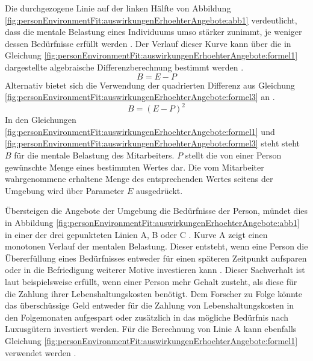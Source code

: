 Die durchgezogene Linie auf der linken Hälfte von Abbildung \ref{fig:personEnvironmentFit:auswirkungenErhoehterAngebote:abb1} verdeutlicht, dass die mentale Belastung eines Individuums umso stärker zunimmt, je weniger dessen Bedürfnisse erfüllt werden \cite[S. 30]{mechanismsOfJobStressAndStrain:1982}\cite[S. 10]{harrison:1978}. Der Verlauf dieser Kurve kann über die in Gleichung \ref{fig:personEnvironmentFit:auswirkungenErhoehterAngebote:formel1} dargestellte algebraische Differenzberechnung bestimmt werden \cite[S. 2]{edwards:1993}.
\begin{equation}
	B = E - P
	\label{fig:personEnvironmentFit:auswirkungenErhoehterAngebote:formel1}
\end{equation}
Alternativ bietet sich die Verwendung der quadrierten Differenz aus Gleichung \ref{fig:personEnvironmentFit:auswirkungenErhoehterAngebote:formel3} an \cite[S. 2]{edwards:1993}.
\begin{equation}
	B = (E - P)^2
	\label{fig:personEnvironmentFit:auswirkungenErhoehterAngebote:formel3}
\end{equation}
In den Gleichungen \ref{fig:personEnvironmentFit:auswirkungenErhoehterAngebote:formel1} und \ref{fig:personEnvironmentFit:auswirkungenErhoehterAngebote:formel3} steht steht $B$ für die mentale Belastung des Mitarbeiters. $P$ stellt die von einer Person gewünschte Menge eines bestimmten Wertes dar. Die vom Mitarbeiter wahrgenommene erhaltene Menge des entsprechenden Wertes seitens der Umgebung wird über Parameter $E$ ausgedrückt. \cite[S. 1f.]{edwards:1993}\cite[S. 2ff.]{copingAndAdaption:1974}

Übersteigen die Angebote der Umgebung die Bedürfnisse der Person, mündet dies in Abbildung \ref{fig:personEnvironmentFit:auswirkungenErhoehterAngebote:abb1} in einer der drei gepunkteten Linien A, B oder C \cite[S. 29ff.]{mechanismsOfJobStressAndStrain:1982}. Kurve A zeigt einen monotonen Verlauf der mentalen Belastung. Dieser entsteht, wenn eine Person die Übererfüllung eines Bedürfnisses entweder für einen späteren Zeitpunkt aufsparen oder in die Befriedigung weiterer Motive investieren kann \cite[S. 21]{edwards:2008}\cite[S. 30]{mechanismsOfJobStressAndStrain:1982}\cite[S. 11]{harrison:1978}. Dieser Sachverhalt ist laut \textcite[S. 21]{edwards:2008} beispielsweise erfüllt, wenn einer Person mehr Gehalt zusteht, als diese für die Zahlung ihrer Lebenshaltungskosten benötigt. Dem Forscher zu Folge könnte das überschüssige Geld entweder für die Zahlung von Lebenshaltungskosten in den Folgemonaten aufgespart oder zusätzlich in das mögliche Bedürfnis nach Luxusgütern investiert werden. Für die Berechnung von Linie A kann ebenfalls Gleichung \ref{fig:personEnvironmentFit:auswirkungenErhoehterAngebote:formel1} verwendet werden \cite[S. 2]{edwards:1993}.

